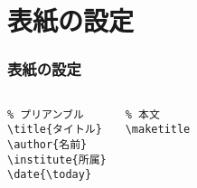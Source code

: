 \section{表紙の設定}
\begin{frame}[fragile]
    \frametitle{表紙の設定}
    \begin{columns}
        \begin{verbatim}
% プリアンブル
\title{タイトル}
\author{名前}
\institute{所属}
\date{\today}
        \end{verbatim}

        \begin{verbatim}
% 本文
\maketitle
        \end{verbatim}
    \end{columns}
\end{frame}
